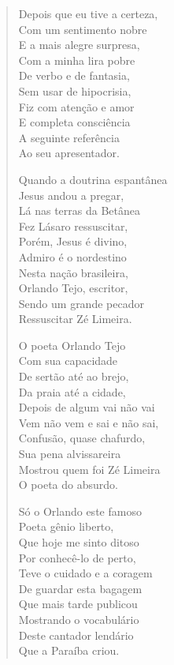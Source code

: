 \begin{verse}
Depois que eu tive a certeza,\\
Com um sentimento nobre\\
E a mais alegre surpresa,\\
Com a minha lira pobre\\
De verbo e de fantasia,\\
Sem usar de hipocrisia,\\
Fiz com atenção e amor\\
E completa consciência\\
A seguinte referência\\
Ao seu apresentador.

Quando a doutrina espantânea\\
Jesus andou a pregar,\\
Lá nas terras da Betânea\\
Fez Lásaro ressuscitar,\\
Porém, Jesus é divino,\\
Admiro é o nordestino\\
Nesta nação brasileira,\\
Orlando Tejo, escritor,\\
Sendo um grande pecador\\
Ressuscitar Zé Limeira.

O poeta Orlando Tejo\\
Com sua capacidade\\
De sertão até ao brejo,\\
Da praia até a cidade,\\
Depois de algum vai não vai\\
Vem não vem e sai e não sai,\\
Confusão, quase chafurdo,\\
Sua pena alvissareira\\
Mostrou quem foi Zé Limeira\\
O poeta do absurdo.

Só o Orlando este famoso\\
Poeta gênio liberto,\\
Que hoje me sinto ditoso\\
Por conhecê-lo de perto,\\
Teve o cuidado e a coragem\\
De guardar esta bagagem\\
Que mais tarde publicou\\
Mostrando o vocabulário\\
Deste cantador lendário\\
Que a Paraíba criou.


\end{verse}
